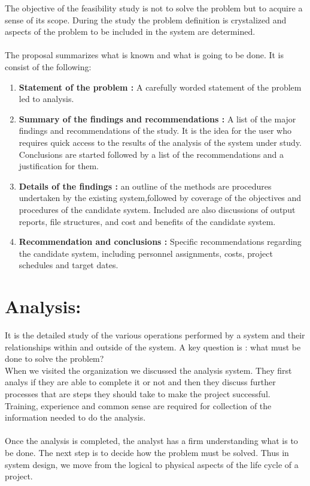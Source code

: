 \documentclass[a4paper,12pt]{report}
\begin{document}
The objective of the feasibility study is not to solve the problem but to acquire a sense of its scope. During the study the problem definition is crystalized and aspects of the problem to be included in the system are determined.\\ \\

The proposal summarizes what is known and what is going to be done. It is consist of the following:
\begin{enumerate}
	\item \textbf{Statement of the problem :} A carefully worded statement of the problem led to analysis.
	
	\item \textbf{	Summary of the findings and recommendations :} A list of the major findings and recommendations of the study. It is the idea for the user who requires quick access to the results of the analysis of the system under study. Conclusions are started followed by a list of the recommendations and a justification for them.
	
	\item \textbf{ Details of the findings :} an outline of the methods are procedures undertaken by the existing system,followed by coverage of the objectives and procedures of the candidate system. Included are also discussions of output reports, file structures, and cost and benefits of the candidate system.
	
	\item \textbf{	Recommendation and conclusions :} Specific recommendations regarding the candidate system, including personnel assignments, costs, project schedules and target dates.
\end{enumerate}
\section{Analysis:}
 It is the detailed study of the various operations performed by a system and their relationships within and outside of the system. A key question is : what must be done to solve the problem?\\ 
 
 When we visited the organization we discussed the analysis system. They first analys if they are able to complete it or not and then they discuss further processes that are steps they should take to make the project successful. Training, experience and common sense are required for collection of the information needed to do the analysis.
 \\ \\
 Once the analysis is completed, the analyst has a firm understanding what is to be done. The next step is to decide how the problem must be solved. Thus in system design, we move from the logical to physical aspects of the life cycle of a project.\\
\end{document}

